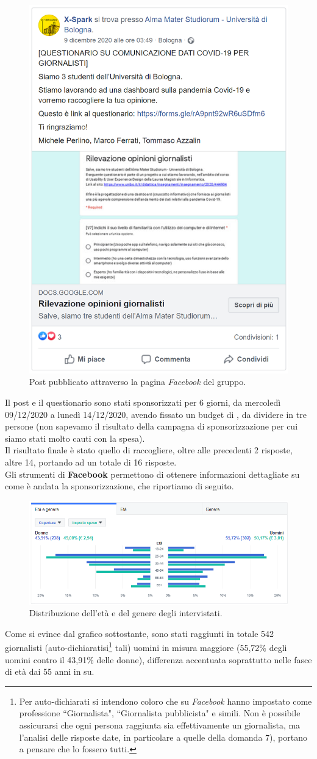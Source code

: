 \begin{figure}[!h] 
    \centering 
    \includegraphics[width=0.4\columnwidth]{assets/images/ricerca-etnografica/post-facebook} 
    \caption{Post pubblicato attraverso la pagina \textit{Facebook} del gruppo.}
\end{figure}
\noindent
Il post e il questionario sono stati sponsorizzati per 6 giorni, da mercoledì 09/12/2020 a lunedì 14/12/2020, avendo fissato un budget di , da dividere in tre persone (non sapevamo il risultato della campagna di sponsorizzazione per cui siamo stati molto cauti con la spesa).\\
Il risultato finale è stato quello di raccogliere, oltre alle precedenti 2 risposte, altre 14, portando ad un totale di 16 risposte.\\
Gli strumenti di \textbf{Facebook} permettono di ottenere informazioni dettagliate su come è andata la sponsorizzazione, che riportiamo di seguito.

\begin{figure}[!h] 
    \centering 
    \includegraphics[width=0.9\columnwidth]{assets/images/ricerca-etnografica/post-facebook-statistiche-eta-genere} 
    \caption{Distribuzione dell'età e del genere degli intervistati.}
\end{figure}
\noindent
Come si evince dal grafico sottostante, sono stati raggiunti in totale 542 giornalisti (auto-dichiaratisi\footnote{Per auto-dichiarati si intendono coloro che su \textit{Facebook} hanno impostato come professione ``Giornalista", ``Giornalista pubblicista" e simili. Non è possibile assicurarsi che ogni persona raggiunta sia effettivamente un giornalista, ma l'analisi delle risposte date, in particolare a quelle della domanda 7), portano a pensare che lo fossero tutti.} tali) uomini in misura maggiore (55,72\% degli uomini contro il 43,91\% delle donne), differenza accentuata soprattutto nelle fasce di età dai 55 anni in su.

